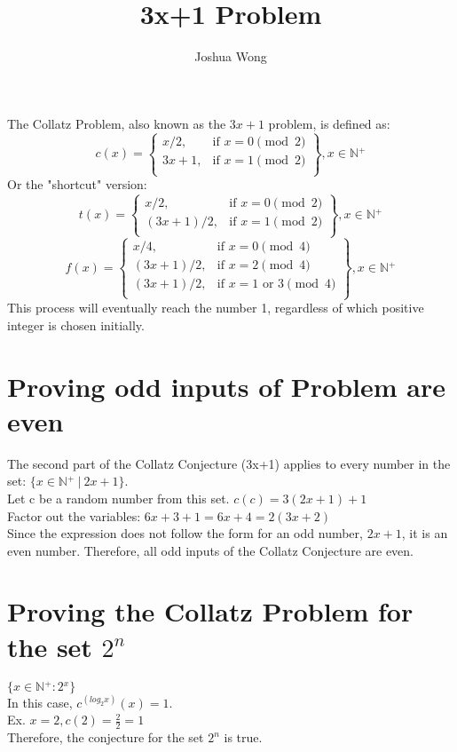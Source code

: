 \documentclass[a4paper,10pt]{article}
\title{3x+1 Problem}
\author{Joshua Wong}
\begin{document}
\maketitle
  The Collatz Problem, also known as the \(3x+1\) problem, is defined as:
  \[
    c(x) = \left.
    \begin{cases}
        x/2, & \text{if } x = 0 {\pmod {2}}\\
        3x+1, & \text{if } x = 1 {\pmod {2}} \\
    \end{cases}
    \right\}, x \in \mathbb{N{^+}}
  \]
  Or the "shortcut" version:
  \[
    t(x) = \left.
    \begin{cases}
        x/2, & \text{if } x = 0 {\pmod {2}}\\
        (3x+1)/2, & \text{if } x = 1 {\pmod {2}} \\
    \end{cases}
    \right\}, x \in \mathbb{N{^+}}
  \]
  \[
    f(x) = \left.
    \begin{cases}
        x/4, & \text{if } x = 0 {\pmod {4}}\\
        (3x+1)/2, & \text{if } x = 2 {\pmod {4}} \\
        (3x+1)/2, & \text{if } x = 1 \text{ or } 3 {\pmod {4}} \\
    \end{cases}
    \right\}, x \in \mathbb{N{^+}}
  \]
  This process will eventually reach the number 1, regardless of which positive integer is chosen initially.
  \section{Proving odd inputs of Problem are even}
  The second part of the Collatz Conjecture (3x+1) applies to every number in the set: \(\{ x \in \mathbb{N{^+}} \ | \ 2x+1 \}\). \\
  Let c be a random number from this set. \(c(c) = 3(2x+1)+1 \) \\
  Factor out the variables: \(6x+3+1 = 6x+4 = 2(3x+2)\) \\
  Since the expression does not follow the form for an odd number, \(2x+1\), it is an even number.
  Therefore, all odd inputs of the Collatz Conjecture are even.
  \section{Proving the Collatz Problem for the set $2^{n}$}
  \(\{x \in \mathbb{N{^+}}: 2{^x}\}\) \\
  In this case, \(c^{(log_2{x})}(x) = 1\). \\
  Ex. \(x = 2, c(2) = \frac{2}{2} = 1\) \\
  Therefore, the conjecture for the set $2^{n}$ is true.
\end{document}
